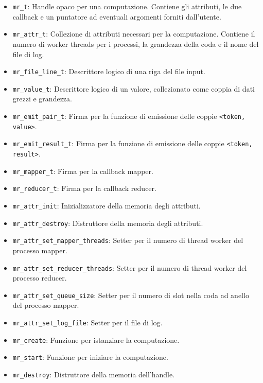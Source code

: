 \documentclass[11pt,a4paper]{article}
\begin{document}
\begin{itemize}
    \item \texttt{mr\_t}: Handle opaco per una computazione. Contiene gli attributi, le due callback e un puntatore ad eventuali argomenti forniti dall'utente.

    \item \texttt{mr\_attr\_t}: Collezione di attributi necessari per la computazione. Contiene il numero di worker threads per i processi, la grandezza della coda e il nome del file di log.

    \item \texttt{mr\_file\_line\_t}: Descrittore logico di una riga del file input.

    \item \texttt{mr\_value\_t}: Descrittore logico di un valore, collezionato come coppia di dati grezzi e grandezza.

    \item \texttt{mr\_emit\_pair\_t}: Firma per la funzione di emissione delle coppie \texttt{<token, value>}.

    \item \texttt{mr\_emit\_result\_t}: Firma per la funzione di emissione delle coppie \texttt{<token, result>}.

    \item \texttt{mr\_mapper\_t}: Firma per la callback mapper.

    \item \texttt{mr\_reducer\_t}: Firma per la callback reducer.

    \item \texttt{mr\_attr\_init}: Inizializzatore della memoria degli attributi.

    \item \texttt{mr\_attr\_destroy}: Distruttore della memoria degli attributi.

    \item \texttt{mr\_attr\_set\_mapper\_threads}: Setter per il numero di thread worker del processo mapper.

    \item \texttt{mr\_attr\_set\_reducer\_threads}: Setter per il numero di thread worker del processo reducer.

    \item \texttt{mr\_attr\_set\_queue\_size}: Setter per il numero di slot nella coda ad anello del processo mapper.

    \item \texttt{mr\_attr\_set\_log\_file}: Setter per il file di log.

    \item \texttt{mr\_create}: Funzione per istanziare la computazione.

    \item \texttt{mr\_start}: Funzione per iniziare la computazione.

    \item \texttt{mr\_destroy}: Distruttore della memoria dell'handle.
\end{itemize}
\end{document}
